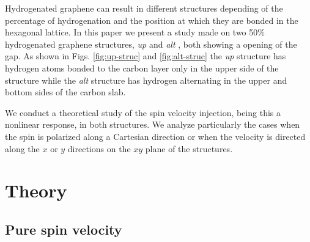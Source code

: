 \documentclass[prb,11pt,tightenlines,twocolumn,aps]{revtex4-1}
\begin{document}
Hydrogenated graphene can result in different structures depending of the
percentage of hydrogenation and the position at which they are bonded in the
hexagonal lattice. In this paper we present a study made on two 50\%
hydrogenated graphene structures, \emph{up} and \emph{alt} , both showing a
opening of the gap. As shown in Figs. \ref{fig:up-struc} and 
\ref{fig:alt-struc} the \emph{up} structure has hydrogen atoms bonded to the
carbon layer only in the upper side of the structure while the \emph{alt}
structure has hydrogen alternating in the upper and bottom sides of the carbon
slab.

We conduct a theoretical study of the spin velocity injection, being this a
nonlinear response, in both structures. We analyze particularly the cases when
the spin is polarized along a Cartesian direction or when the velocity is
directed along the $x$ or $y$ directions on the $xy$ plane of the structures.




\section{Theory} %
\label{sec:theory}




\subsection{Pure spin velocity} %
\label{sec:theory-pure_spin_current}
\end{document}

